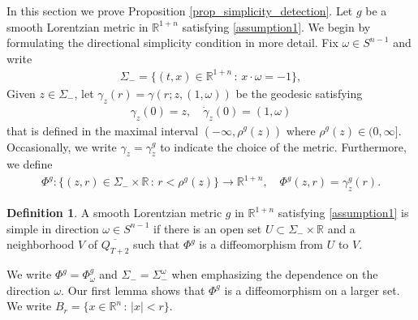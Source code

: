 \documentclass[11pt,letterpaper]{amsart}
\theoremstyle{definition}
\newtheorem{Definition}[Theorem]{Definition}
\numberwithin{equation}{section}
\newcommand{\mR}{\mathbb{R}}                    %
\def\R{\mathbb R}
\def\mid{\,:\,}
\begin{document}
In this section we prove Proposition \ref{prop_simplicity_detection}.
Let $g$ be a smooth Lorentzian metric  in $\mR^{1+n}$ satisfying \eqref{assumption1}.
We begin by formulating the directional simplicity condition in more detail.
Fix $\omega \in S^{n-1}$ and write 
    \begin{align}\label{def_Sigma_minus}
\Sigma_- = \{ (t,x) \in \R^{1+n} \,:\, x \cdot \omega = - 1 \},
    \end{align}
Given $z \in \Sigma_-$, let $\gamma_z(r) = \gamma(r; z, (1, \omega))$ be the geodesic satisfying 
    \begin{align*}%
\gamma_z(0) = z, \quad \dot{\gamma}_z(0) = (1,\omega)
    \end{align*}
that is defined in the maximal interval $(-\infty,\rho^g(z))$ where $\rho^g(z) \in (0,\infty]$. Occasionally, we write $\gamma_z = \gamma_z^g$ to indicate the choice of the metric. Furthermore, we define
    \begin{align}\label{Phig}
\Phi^g : \{(z,r) \in \Sigma_- \times \R \mid r < \rho^g(z) \}
\to \R^{1+n}, \quad \Phi^g(z, r) = \gamma_z^g(r).
    \end{align}

\begin{Definition}\label{simple_in_omega}
A smooth Lorentzian metric $g$ in $\mR^{1+n}$ satisfying \eqref{assumption1} is simple in direction $\omega \in S^{n-1}$ if there is an open set $U \subset \Sigma_- \times \R$ and a neighborhood $V$ of $\overline{Q_{T+2}}$ such that $\Phi^g$ is a diffeomorphism from $U$ to $V$. 
\end{Definition}

We write $\Phi^g = \Phi^g_\omega$ and $\Sigma_- = \Sigma_-^\omega$ when emphasizing the dependence on the direction $\omega$. Our first lemma shows that $\Phi^g$ is a diffeomorphism on a larger set. We write $B_r = \{x \in \R^n \mid |x| < r\}$.
\end{document}
